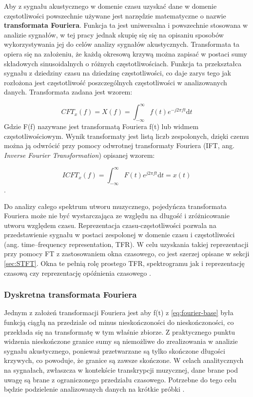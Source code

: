 \documentclass[12pt,a4paper,twoside]{mwart}
\begin{document}
Aby z sygnału akustycznego w domenie czasu uzyskać dane w domenie częstotliwości powszechnie używane jest narzędzie matematyczne o nazwie \textbf{transformata Fouriera}. Funkcja ta jest uniwersalna i powszechnie stosowana w analizie sygnałów, w tej pracy jednak skupię się się na opisaniu sposobów wykorzystywania jej do celów analizy sygnałów akustycznych. Transformata ta opiera się na założeniu, że każdą okresową krzywą można zapisać w postaci sumy składowych sinusoidalnych o różnych częstotliwościach. Funkcja ta przekształca sygnału z dziedziny czasu na dziedzinę częstotliwości, co daje zarys tego jak rozłożona jest częstotliwość poszczególnych częstotliwości w analizowanych danych. Transformata zadana jest wzorem:

\begin{equation} \label{eq:fourier-base}
CFT_x(f) = X(f) = \int_{-\infty}^{\infty}\textit{f}(t)e^ {-j2\pi ft}\mathrm{d}t
\end{equation}
Gdzie F(f) nazywane jest transformatą Fouriera f(t) lub widmem częstotliwościowym. Wynik transformaty jest listą liczb zespolonych, dzięki czemu można ją odwrócić przy pomocy odwrotnej transformaty Fouriera (IFT, ang. \textit{Inverse Fourier Transformation}) opisanej wzorem:

\begin{equation} \label{eq:inverse:fourier-base}
ICFT_x(f) = \int_{-\infty}^{\infty}\textit{F}(t)e^ {j2\pi ft}\mathrm{d}t = x(t)
\end{equation}
\cite{TransformacjaFourieraWroc}\cite{TransformacjaFourieraAgh}\cite[22-25]{Transcription:Anssi:SignalProcessingMethods}.

Do analizy całego spektrum utworu muzycznego, pojedyńcza transformata Fouriera może nie być wystarczająca ze względu na długość i zróżnicowanie utworu względem czasu. Reprezentacja czasu-częstotliwości pozwala na przedstawienie sygnału w postaci zespolonej w domenie czasu i częstotliwości (ang. time–frequency representation, TFR). W celu uzyskania takiej reprezentacji przy pomocy FT z zastosowaniem okna czasowego, co jest szerzej opisane w sekcji \ref{sec:STFT}. Okna te pełnią rolę prostego TFR, spektrogramu jak i reprezentację czasową czy reprezentację opóźnienia czasowego \cite[21-22]{Transcription:Anssi:SignalProcessingMethods}.

\subsubsection{Dyskretna transformata Fouriera} \label{sec:DFT}
Jednym z założeń transformacji Fouriera jest aby f(t) z \ref{eq:fourier-base} była funkcją ciągłą na przedziale od minus nieskończoności do nieskończoności, co przekłada się na transformatę w tym właśnie zbiorze. Z praktycznego punktu widzenia nieskończone granice sumy są niemożliwe do zrealizowania w analizie sygnału akustycznego, ponieważ przetwarzane są tylko skończone długości krzywych, co powoduje, że granice są zawsze skończone. W celach analitycznych na sygnałach, zwłaszcza w kontekście transkrypcji muzycznej, dane brane pod uwagę są brane z ograniczonego przedziału czasowego. Potrzebne do tego celu będzie podzielenie analizowanych danych na krótkie próbki \cite{TransformacjaFourieraWroc}\cite{TransformacjaFourieraelektronikab2b}.
\end{document}
